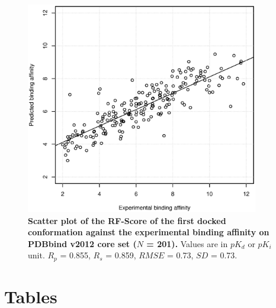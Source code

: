 \documentclass[10pt]{article}
\begin{document}
\begin{figure}[!ht]
\begin{center}
\includegraphics[width=4in]{pK-idockConf1RFScore.eps}
\end{center}
\caption{
{\bf Scatter plot of the RF-Score of the first docked conformation against the experimental binding affinity on PDBbind v2012 core set ($N$ = 201).} Values are in $pK_d$ or $pK_i$ unit. $R_p$ = 0.855, $R_s$ = 0.859, $RMSE$ = 0.73, $SD$ = 0.73.
}
\label{pK-idockConf1RFScore}
\end{figure}

\section*{Tables}
\end{document}
